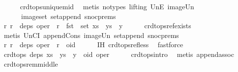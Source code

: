 \begin{isabellebody}
\ \ \ \ \isamarkupfalse%
\ crdt{\isacharunderscore}ops{\isacharunderscore}unique{\isacharunderscore}mid\ \isamarkupfalse%
\ {\isacharparenleft}metis\ {\isacharparenleft}no{\isacharunderscore}types{\isacharcomma}\ lifting{\isacharparenright}\ UnE\ image{\isacharunderscore}Un\ \isanewline
\ \ \ \ \ \ image{\isacharunderscore}set\ set{\isacharunderscore}append\ snoc{\isachardot}prems{\isacharparenleft}{}{\isacharparenright}{\isacharparenright}\isanewline
\ \ \isamarkupfalse%
\ \isamarkupfalse%
\ {\isachardoublequoteopen}{\isasymAnd}r{\isachardot}\ r\ {\isasymin}\ deps\ oper\ {\isasymLongrightarrow}\ r\ {\isasymin}\ fst\ {\isacharbackquote}\ set\ {\isacharparenleft}xs\ {\isacharat}\ ys\ {\isacharat}\ {\isacharbrackleft}y{\isacharbrackright}{\isacharparenright}{\isachardoublequoteclose}\isanewline
\ \ \ \ \isamarkupfalse%
\ crdt{\isacharunderscore}ops{\isacharunderscore}ref{\isacharunderscore}exists\isanewline
\ \ \ \ \isamarkupfalse%
\ {\isacharparenleft}metis\ UnCI\ append{\isacharunderscore}Cons\ image{\isacharunderscore}Un\ set{\isacharunderscore}append\ snoc{\isachardot}prems{\isacharparenleft}{}{\isacharparenright}{\isacharparenright}\isanewline
\ \ \isamarkupfalse%
\ \isamarkupfalse%
\ {\isachardoublequoteopen}{\isasymAnd}r{\isachardot}\ r\ {\isasymin}\ deps\ oper\ {\isasymLongrightarrow}\ r\ {\isacharless}\ oid{\isachardoublequoteclose}\isanewline
\ \ \ \ \isamarkupfalse%
\ IH\ crdt{\isacharunderscore}ops{\isacharunderscore}ref{\isacharunderscore}less\ \isamarkupfalse%
\ fastforce\isanewline
\ \ \isamarkupfalse%
\ \isamarkupfalse%
\ {\isachardoublequoteopen}crdt{\isacharunderscore}ops\ deps\ {\isacharparenleft}xs\ {\isacharat}\ {\isacharparenleft}ys\ {\isacharat}\ {\isacharbrackleft}y{\isacharbrackright}{\isacharparenright}\ {\isacharat}\ {\isacharbrackleft}{\isacharparenleft}oid{\isacharcomma}\ oper{\isacharparenright}{\isacharbrackright}{\isacharparenright}{\isachardoublequoteclose}\isanewline
\ \ \ \ \isamarkupfalse%
\ crdt{\isacharunderscore}ops{\isacharunderscore}intro\ \isamarkupfalse%
\ {\isacharparenleft}metis\ append{\isacharunderscore}assoc{\isacharparenright}\isanewline
{}\isamarkupfalse%
%
\endisatagproof
{\isafoldproof}%
%
\isadelimproof
\isanewline
%
\endisadelimproof
\isanewline
{}\isamarkupfalse%
\ crdt{\isacharunderscore}ops{\isacharunderscore}rem{\isacharunderscore}middle{\isacharcolon}\isanewline

\end{isabellebody}
